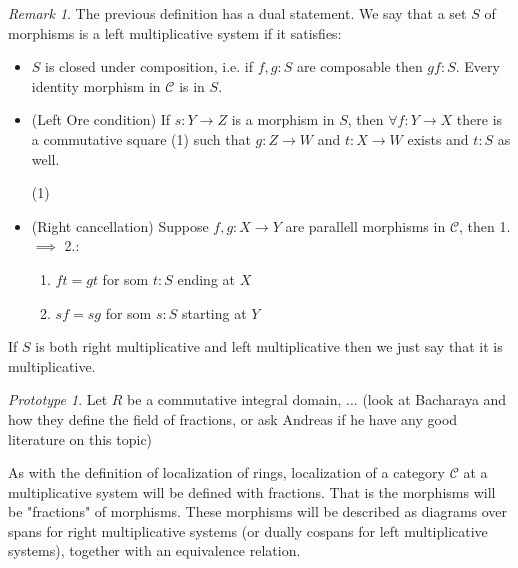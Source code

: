 \documentclass[12pt]{article}
\theoremstyle{definition}
\theoremstyle{remark}
\newtheorem*{remark}{Remark}
\newtheorem*{prototype}{Prototype}
\begin{document}
            \begin{remark}
                The previous definition has a dual statement. We say that a set $S$ of morphisms is a left multiplicative system if it satisfies:
                \begin{itemize}
                    \item $S$ is closed under composition, i.e. if $f,g : S$ are composable then $gf : S$. Every identity morphism in $\mathcal{C}$ is in $S$.
                    \item (Left Ore condition) If $s : Y \rightarrow Z$ is a morphism in $S$, then $\forall f:Y\rightarrow X$ there is a commutative square (1) such that $g:Z\rightarrow W$ and $t:X\rightarrow W$ exists and $t:S$ as well.
                    \begin{center}
                        (1)
                    \end{center}
                    \item (Right cancellation) Suppose $f,g:X\rightarrow Y$ are parallell morphisms in $\mathcal{C}$, then 1. $\implies$ 2.:
                    \begin{enumerate}
                        \item $ft = gt$ for som $t:S$ ending at $X$
                        \item $sf = sg$ for som $s:S$ starting at $Y$
                    \end{enumerate}
                \end{itemize}
                If $S$ is both right multiplicative and left multiplicative then we just say that it is multiplicative.
            \end{remark}

            \begin{prototype}
                Let $R$ be a commutative integral domain, ... (look at Bacharaya and how they define the field of fractions, or ask Andreas if he have any good literature on this topic)
            \end{prototype}

            As with the definition of localization of rings, localization of a category $\mathcal{C}$ at a multiplicative system will be defined with fractions. That is the morphisms will be "fractions" of morphisms. These morphisms will be described as diagrams over spans for right multiplicative systems (or dually cospans for left multiplicative systems), together with an equivalence relation.
\end{document}
